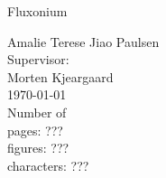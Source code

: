 \begin{titlepage}
        \def \ColourPDF {Images/ku-farve.pdf}
        \def \TitlePDF   {Images/ku-en.pdf}
    \begin{center}
    \vspace*{9cm}
        \Huge
        Fluxonium


    \vspace{1.cm}
        \vfill
        \Large
        Amalie Terese Jiao Paulsen
        \\
        \large
        Supervisor: 
        \\
        Morten Kjeargaard
        \\
        \vspace{0.8cm}
        \today
        \large{\\ Number of \\
                pages: ???  \\ 
                figures: ??? \\
                characters: ???}
        
    \end{center}
\end{titlepage}